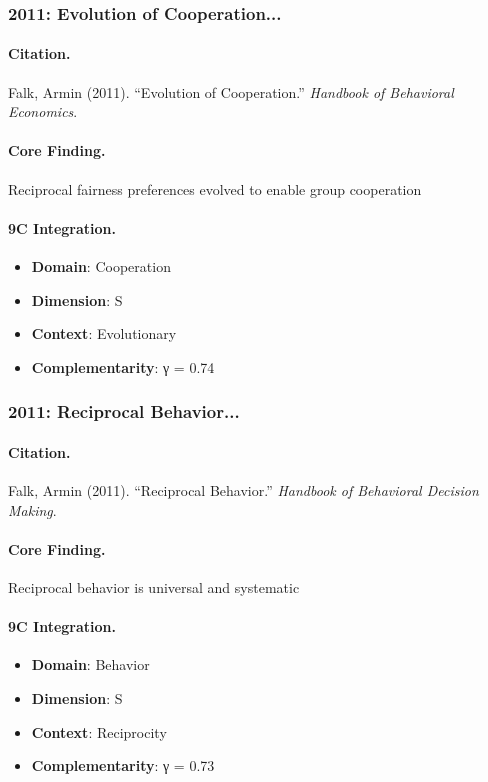 \subsubsection{2011: Evolution of Cooperation...}

\paragraph{Citation.}
Falk, Armin (2011). ``Evolution of Cooperation.''
\textit{Handbook of Behavioral Economics}.

\paragraph{Core Finding.}
Reciprocal fairness preferences evolved to enable group cooperation

\paragraph{9C Integration.}
\begin{itemize}[nosep]
  \item \textbf{Domain}: Cooperation
  \item \textbf{Dimension}: S
  \item \textbf{Context}: Evolutionary
  \item \textbf{Complementarity}: γ = 0.74
\end{itemize}


\subsubsection{2011: Reciprocal Behavior...}

\paragraph{Citation.}
Falk, Armin (2011). ``Reciprocal Behavior.''
\textit{Handbook of Behavioral Decision Making}.

\paragraph{Core Finding.}
Reciprocal behavior is universal and systematic

\paragraph{9C Integration.}
\begin{itemize}[nosep]
  \item \textbf{Domain}: Behavior
  \item \textbf{Dimension}: S
  \item \textbf{Context}: Reciprocity
  \item \textbf{Complementarity}: γ = 0.73
\end{itemize}


